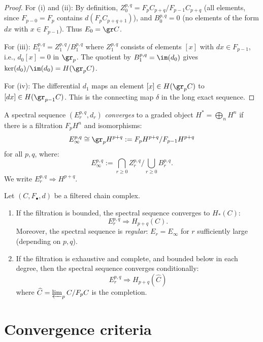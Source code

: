 \begin{proof}
For (i) and (ii): By definition, $Z_0^{p,q} = F_p C_{p+q} / F_{p-1} C_{p+q}$ 
(all elements, since $F_{p-0} = F_p$ contains $d(F_p C_{p+q+1})$), and 
$B_0^{p,q} = 0$ (no elements of the form $dx$ with $x \in F_{p-1}$). Thus 
$E_0 = \gr C$.

For (iii): $E_1^{p,q} = Z_1^{p,q} / B_1^{p,q}$ where $Z_1^{p,q}$ consists of 
elements $[x]$ with $dx \in F_{p-1}$, i.e., $d_0[x] = 0$ in $\gr_p$. The 
quotient by $B_1^{p,q} = \im(d_0)$ gives $\ker(d_0)/\im(d_0) = H(\gr_p C)$.

For (iv): The differential $d_1$ maps an element $[x] \in H(\gr_p C)$ to $[dx] 
\in H(\gr_{p-1} C)$. This is the connecting map $\delta$ in the 
long exact sequence.
\end{proof}

\begin{definition}[Convergence]
\label{def:ss-convergence}
A spectral sequence $(E_r^{p,q}, d_r)$ \emph{converges} to a graded object 
$H^* = \bigoplus_n H^n$ if there is a filtration $F_p H^n$ and isomorphisms:
\[
E_\infty^{p,q} \cong \gr_p H^{p+q} := F_p H^{p+q} / F_{p-1} H^{p+q}
\]
for all $p, q$, where:
\[
E_\infty^{p,q} := \bigcap_{r \geq 0} Z_r^{p,q} / \bigcup_{r \geq 0} B_r^{p,q}.
\]
We write $E_r^{p,q} \Rightarrow H^{p+q}$.
\end{definition}

\begin{theorem}
\label{thm:classical-convergence}
Let $(C, F_\bullet, d)$ be a filtered chain complex.
\begin{enumerate}[label=(\roman*)]
\item If the filtration is bounded, the spectral sequence converges to $H_*(C)$:
\[
E_r^{p,q} \Rightarrow H_{p+q}(C).
\]
Moreover, the spectral sequence is \emph{regular}: $E_r = E_\infty$ for 
$r$ sufficiently large (depending on $p, q$).

\item If the filtration is exhaustive and complete, and bounded below in each 
degree, then the spectral sequence converges conditionally:
\[
E_r^{p,q} \Rightarrow H_{p+q}(\widehat{C})
\]
where $\widehat{C} = \varprojlim_p C / F_p C$ is the completion.
\end{enumerate}
\end{theorem}


\section{Convergence criteria}
\label{sec:convergence-criteria}

